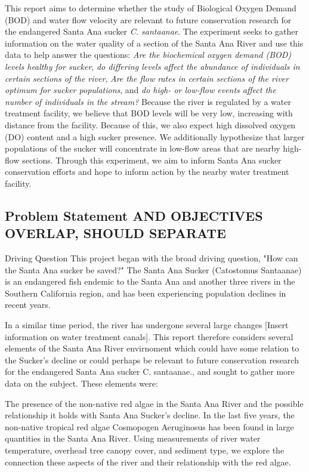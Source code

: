 \documentclass{article}\usepackage[]{graphicx}\usepackage[]{color}
\begin{document}
This report aims to determine whether the study of Biological Oxygen Demand (BOD) and water flow velocity are relevant to future conservation research for the endangered Santa Ana sucker \emph{C. santaanae}. The experiment seeks to gather information on the water quality of a section of the Santa Ana River and use this data to help answer the questions: \emph{Are the biochemical oxygen demand (BOD) levels healthy for sucker}, \emph{do differing levels affect the  abundance of individuals in certain sections of the river}, \emph{Are the flow rates in certain sections of the river optimum for sucker populations}, and \emph{do high- or low-flow events affect the number of individuals in the stream?} Because the river is regulated by a water treatment facility, we believe that BOD levels will be very low, increasing with distance from the facility. Because of this, we also expect high dissolved oxygen (DO) content and a high sucker presence. We additionally hypothesize that larger populations of the sucker will concentrate in low-flow areas that are nearby high-flow sections. Through this experiment, we aim to inform Santa Ana sucker conservation efforts and hope to inform action by the nearby water treatment facility. 


\subsection{Problem Statement AND OBJECTIVES OVERLAP, SHOULD SEPARATE}


Driving Question 
This project began with the broad driving question, "How can the Santa Ana sucker be saved?" The Santa Ana Sucker (Catostomus Santaanae) is an endangered fish endemic to the Santa Ana and another three rivers in the Southern California region, and has been experiencing population declines in recent years.


In a similar time period, the river has undergone several large changes [Insert information on water treatment canals]. This report therefore considers several elements of the Santa Ana River envirnoment which could have some relation to the Sucker’s decline or could perhaps be relevant to future conservation research for the endangered Santa Ana sucker C. santaanae., and sought to gather more data on the subject. These elements were: 


The presence of the non-native red algae in the Santa Ana River and the possible relationship it holds with Santa Ana Sucker’s decline. In the last five years, the non-native tropical red algae Cosmopogen Aeruginosus has been found in large quantities in the Santa Ana River. Using measurements of river water temperature, overhead tree canopy cover, and sediment type, we explore the connection these aspects of the river and their relationship with the red algae.
\end{document}
